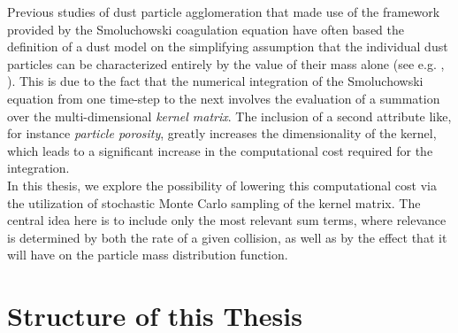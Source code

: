 Previous studies of dust particle agglomeration that made use of the framework provided by the 
Smoluchowski coagulation equation have often based the definition of a dust model on the 
simplifying assumption that the individual 
dust particles can be characterized entirely by the value of their mass alone (see e.g. 
    \cite{dullemond_dominik_2004},
    \cite{birnstiel_dullemond_brauer_2010}). 
This is due to the fact that the numerical integration of the Smoluchowski equation from one 
time-step to the next involves the evaluation of a summation over 
the multi-dimensional \textit{kernel matrix}.
The inclusion of a second attribute like, for instance \textit{particle porosity}, greatly 
increases the dimensionality of the kernel, which leads to a significant increase in the 
computational cost required for the integration. \\

In this thesis, we explore the possibility of lowering this computational cost via the 
utilization of stochastic Monte Carlo sampling of the kernel matrix. The central idea here is 
to include only the most relevant sum terms, where relevance is determined by both the rate of 
a given collision,  as well as by the effect that it will have on the particle mass distribution
function. 







\section{Structure of this Thesis}

